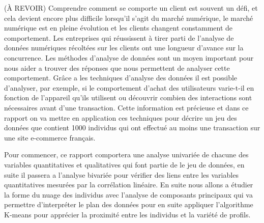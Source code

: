 
(À REVOIR) Comprendre comment se comporte un client est souvent un défi, et cela devient encore plus difficile lorsqu'il s'agit du marché numérique, le marché numérique est en pleine évolution et les clients changent constamment de comportement. Les entreprises qui réussissent à tirer parti de l'analyse de données numériques récoltées sur les clients ont une longueur d'avance sur la concurrence. Les méthodes d’analyse de données sont un moyen important pour nous aider a trouver des réponses que nous permettent de analyser cette comportement. Grâce a les techniques d’analyse des données il est possible d'analyser, par exemple, si le comportement d'achat des utilisateurs varie-t-il en fonction de l'appareil qu'ils utilisent ou découvrir combien des interactions sont nécessaires avant d'une transaction. Cette information est précieuse et dans ce rapport on va mettre en application ces techniques pour décrire un jeu des données que contient 1000 individus  qui ont effectué au moins une transaction sur une site e-commerce français.

Pour commencer, ce rapport comportera une analyse univariée de chacune des variables quantitatives et qualitatives qui font partie de le jeu de données, en suite il passera a l'analyse bivariée pour vérifier des liens entre les variables quantitatives mesurées par la corrélation linéaire. En suite nous allons a étudier la forme du nuage des individus avec l'analyse de composants principaux qui va permettre d'interpréter le plan des données pour en suite appliquer l'algorithme K-means pour apprécier la proximité entre les individus et la variété de profils.